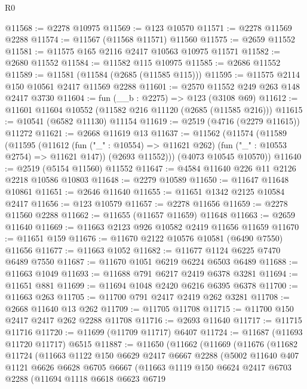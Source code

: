 \begin{lexlean}{R0}
\begin{coremodule}
@11568 := @2278 @10975
@11569 := @123 @10570
@11571 := @2278 @11569 @2288
@11574 := @11567 (@11568 @11571) @11560
@11575 := @2659 @11552
@11581 := @11575 @165 @2116 @2417 @10563 @10975 @11571
@11582 := @2680 @11552
@11584 := @11582 @115 @10975
@11585 := @2686 @11552
@11589 := @11581 (@11584 (@2685 (@11585 @115)))
@11595 := @11575 @2114 @150 @10561 @2417 @11569 @2288
@11601 := @2570 @11552 @249 @263 @148 @2417 @3730
@11604 := fun (__b : @2275) => @123 (@3108 @69)
@11612 := @11601 @11604 @10552 (@11582 @216 @11120 (@2685 (@11585 @216)))
@11615 := @10541 (@6582 @11130) @11154
@11619 := @2519 (@4716 (@2279 @11615)) @11272
@11621 := @2668 @11619 @13
@11637 := @11562
    (@11574
      (@11589
        (@11595
          (@11612 (fun ("_" : @10554) => @11621 @262) (fun ("_" : @10553 @2754) => @11621 @147))
          (@2693 @11552)))
      (@4073 @10545 @10570))
@11640 := @2519 (@5154 @11560) @11552
@11647 := @4584 @11640 @226 @11 @2126 @2218 @10586 @10803
@11648 := @2279 @10589
@11650 := @11647 @11648 @10861
@11651 := @2646 @11640
@11655 := @11651 @1342 @2125 @10584 @2417
@11656 := @123 @10579
@11657 := @2278 @11656
@11659 := @2278 @11560 @2288
@11662 := @11655 (@11657 @11659) @11648
@11663 := @2659 @11640
@11669 := @11663 @2123 @926 @10582 @2419 @11656 @11659
@11670 := @11651 @159
@11676 := @11670 @2122 @10576 @10581 (@6490 @7550) @11656
@11677 := @11663 @1052
@11682 := @11677 @1124 @6225 @7470 @6489 @7550
@11687 := @11670 @1051 @6219 @6224 @6503 @6489
@11688 := @11663 @1049
@11693 := @11688 @791 @6217 @2419 @6378 @3281
@11694 := @11651 @881
@11699 := @11694 @1048 @2420 @6216 @6395 @6378
@11700 := @11663 @263
@11705 := @11700 @791 @2417 @2419 @262 @3281
@11708 := @2668 @11640 @13 @262
@11709 := @11705 @11708
@11715 := @11700 @150 @2417 @2417 @262 @2288 @11708
@11716 := @2693 @11640
@11717 := @11715 @11716
@11720 := @11699 (@11709 @11717) @6407
@11724 := @11687 (@11693 @11720 @11717) @6515
@11887 := @11650
    (@11662
      (@11669
        (@11676
          (@11682
            @11724
            (@11663
              @1122
              @150
              @6629
              @2417
              @6667
              @2288
              (@5002
                @11640
                @407
                @1121
                @6626
                @6628
                @6705
                @6667
                (@11663
                  @1119
                  @150
                  @6624
                  @2417
                  @6703
                  @2288
                  (@11694
                    @1118
                    @6618
                    @6623
                    @6719

\end{coremodule}
\end{lexlean}
